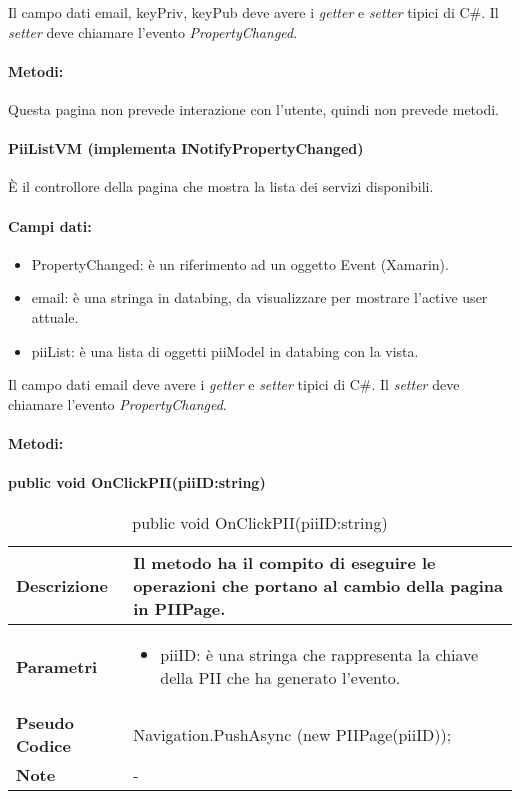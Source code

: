 Il campo dati email, keyPriv, keyPub deve avere i \emph{getter} e \emph{setter} tipici di C\#. Il \emph{setter} deve chiamare l’evento \emph{PropertyChanged}.


\paragraph{Metodi:}
Questa pagina non prevede interazione con l’utente, quindi non prevede metodi.

\paragraph{PiiListVM (implementa INotifyPropertyChanged)}
È il controllore della pagina che mostra la lista dei servizi disponibili.
\paragraph{Campi dati:}
\begin{itemize}
    \item PropertyChanged: è un riferimento ad un oggetto Event (Xamarin).
    \item email: è una stringa in databing, da visualizzare per mostrare l’active user attuale. 
    \item piiList: è una lista di oggetti piiModel in databing con la vista.
\end{itemize}

Il campo dati email deve avere i \emph{getter} e \emph{setter} tipici di C\#. Il \emph{setter} deve chiamare l’evento \emph{PropertyChanged}.
\paragraph{Metodi:}



\paragraph{public void OnClickPII(piiID:string)}
\begin{center}
    \begin{longtable}{|p{3cm}|p{9cm}|}%
    \caption{public void OnClickPII(piiID:string)}
    \endfirsthead
    \endhead
    \hline
    \textbf{Descrizione} & Il metodo ha il compito di eseguire le operazioni che portano al cambio della pagina in PIIPage.\\
    \hline
    \textbf{Parametri} &      
    \begin{itemize}
        \item piiID: è una stringa che rappresenta la chiave della PII che ha generato l’evento.
    \end{itemize}
    \\
    \hline
    \textbf{Pseudo Codice} & 
    Navigation.PushAsync (new PIIPage(piiID));
    \\
    \hline
    \textbf{Note} & 
    -
    \\
    \hline
    \end{longtable}
\end{center}





